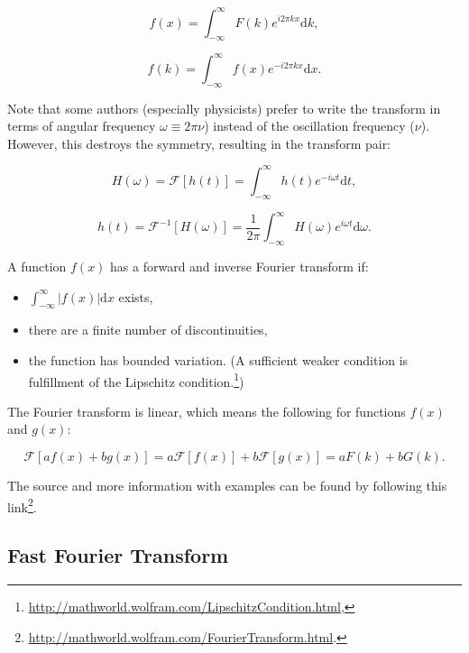 \documentclass[12pt]{article}
\theoremstyle{plain}
\begin{document}
\begin{equation}
f(x) = \int_{-\infty}^{\infty} F(k) e^{i 2 \pi k x} \text{d}k,
\end{equation}

\begin{equation}
f(k) = \int_{-\infty}^{\infty} f(x) e^{-i 2 \pi k x} \text{d}x.
\end{equation}

Note that some authors (especially physicists) prefer to write the transform in terms of angular frequency $\omega \equiv 2 \pi \nu$) instead of the oscillation frequency ($\nu$). However, this destroys the symmetry, resulting in the transform pair:


\begin{equation}
H(\omega) = \mathcal{F}[h(t)] = \int_{-\infty}^{\infty} h(t) e^{-i \omega t} \text{d}t,
\end{equation}

\begin{equation}
h(t) = \mathcal{F}^{-1}[H(\omega)] = \frac{1}{2 \pi} \int_{-\infty}^{\infty} H(\omega) e^{i \omega t} \text{d}\omega.
\end{equation}

A function $f(x)$ has a forward and inverse Fourier transform if:

\begin{itemize}
	\item $\int_{-\infty}^{\infty} |f(x)| \text{d}x$ exists,
	\item there are a finite number of discontinuities,
	\item the function has bounded variation. (A sufficient weaker condition is fulfillment of the Lipschitz condition.\footnote{\url{http://mathworld.wolfram.com/LipschitzCondition.html},})
\end{itemize}

The Fourier transform is linear, which means the following for functions $f(x)$ and $g(x)$:

\begin{equation}
\mathcal{F}[a f(x) + b g(x)] = a \mathcal{F}[f(x)] + b \mathcal{F}[g(x)] = a F(k) + b G(k).
\end{equation}

The source and more information with examples can be found by following this link\footnote{\url{http://mathworld.wolfram.com/FourierTransform.html}.}. 

\subsection{Fast Fourier Transform}
\end{document}
